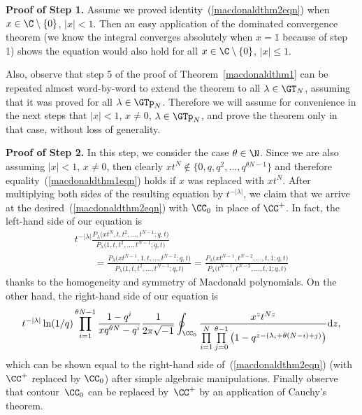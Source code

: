 \textbf{Proof of Step 1.} Assume we proved identity~(\ref{macdonaldthm2eqn}) when $x\in\C \setminus \{0\}$, $|x| < 1$. Then an easy application of the dominated convergence theorem (we know the integral converges absolutely when $x = 1$ because of step 1) shows the equation would also hold for all $x\in\C \setminus \{0\}$, $|x|\leq 1$.

Also, observe that step 5 of the proof of Theorem~\ref{macdonaldthm1} can be repeated almost word-by-word to extend the theorem to all $\lambda\in\GT_N$, assuming that it was proved for all $\lambda\in\GTp_N$. Therefore we will assume for convenience in the next steps that $|x| < 1$, $x\neq 0$, $\lambda\in\GTp_N$, and prove the theorem only in that case, without loss of generality.

\textbf{Proof of Step 2.} In this step, we consider the case $\theta\in\N$. Since we are also assuming $|x| < 1$, $x\neq 0$, then clearly $xt^N\notin\big\{0, q, q^2, \dots, q^{\theta N - 1}\big\}$ and therefore equality~(\ref{macdonaldthm1eqn}) holds if $x$ was replaced with $xt^N$. After multiplying both sides of the resulting equation by $t^{-|\lambda|}$, we claim that we arrive at the desired~(\ref{macdonaldthm2eqn}) with $\CC_0$ in place of $\CC^+$. In fact, the left-hand side of our equation is
\begin{gather*}
t^{-|\lambda|}\frac{P_{\lambda}\big(xt^N, t, t^2, \dots, t^{N-1}; q, t\big)}{P_{\lambda}\big(1, t, t^2, \dots, t^{N-1}; q, t\big)} \\
\qquad{} = \frac{P_{\lambda}\big(xt^{N-1}, 1, t, \dots, t^{N-2}; q, t\big)}{P_{\lambda}\big(1, t, t^2, \dots, t^{N-1}; q, t\big)} = \frac{P_{\lambda}\big(xt^{N-1}, t^{N-2}, \dots, t, 1; q, t\big)}{P_{\lambda}\big(t^{N-1}, t^{N-2}, \dots, t, 1; q, t\big)}
\end{gather*}
thanks to the homogeneity and symmetry of Macdonald polynomials. On the other hand, the right-hand side of our equation is
\begin{gather*}
t^{-|\lambda|}\ln(1/q)\prod_{i=1}^{\theta N - 1}{\frac{1 - q^i}{xq^{\theta N} - q^i}}\frac{1}{2\pi\sqrt{-1}}\oint_{\CC_0}{\frac{x^zt^{Nz}}{\prod\limits_{i=1}^N\prod\limits_{j=0}^{\theta -1}{\big(1 - q^{z - (\lambda_i + \theta(N-i) + j)}\big)}}{\rm d}z},
\end{gather*}
which can be shown equal to the right-hand side of~(\ref{macdonaldthm2eqn}) (with $\CC^+$ replaced by $\CC_0$) after simple algebraic manipulations. Finally observe that contour~$\CC_0$ can be replaced by~$\CC^+$ by an application of Cauchy's theorem.

